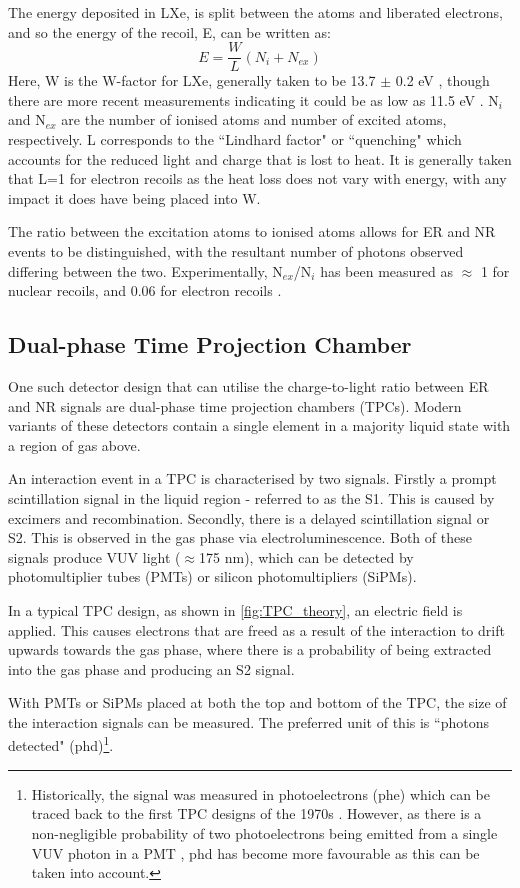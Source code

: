 \par
The energy deposited in LXe, is split between the atoms and liberated electrons, and so the energy of the recoil, E, can be written as:
\begin{equation}
    E = \frac{W}{L}(N_i + N_{ex})
\end{equation}
Here, W is the W-factor for LXe, generally taken to be 13.7 $\pm$ 0.2 eV \cite{light_and_charge_of_xenon_ref}, though there are more recent measurements indicating it could be as low as 11.5 eV \cite{electron_excitation_energy_of_xenon_ref}. 
N$_i$ and N$_{ex}$ are the number of ionised atoms and number of excited atoms, respectively.
L corresponds to the ``Lindhard factor" or ``quenching" which accounts for the reduced light and charge that is lost to heat.
It is generally taken that L=1 for electron recoils as the heat loss does not vary with energy, with any impact it does have being placed into W.
\par
The ratio between the excitation atoms to ionised atoms allows for ER and NR events to be distinguished, with the resultant number of photons observed differing between the two.
Experimentally, N$_{ex}$/N$_i$ has been measured as $\approx$ 1 for nuclear recoils, and 0.06 for electron recoils \cite{ionisation_to_excitation_ratio_xenon_ref}.

\subsection{Dual-phase Time Projection Chamber}
\par
One such detector design that can utilise the charge-to-light ratio between ER and NR signals are dual-phase time projection chambers (TPCs).
Modern variants of these detectors contain a single element in a majority liquid state with a region of gas above.
\par
An interaction event in a TPC is characterised by two signals.
Firstly a prompt scintillation signal in the liquid region - referred to as the S1.
This is caused by excimers and recombination.
Secondly, there is a delayed scintillation signal or S2.
This is observed in the gas phase via electroluminescence.
Both of these signals produce VUV light ($\approx$175 nm), which can be detected by photomultiplier tubes (PMTs) or silicon photomultipliers (SiPMs).
\par
In a typical TPC design, as shown in \autoref{fig:TPC_theory}, an electric field is applied.
This causes electrons that are freed as a result of the interaction to drift upwards towards the gas phase, where there is a probability of being extracted into the gas phase and producing an S2 signal.
\par
With PMTs or SiPMs placed at both the top and bottom of the TPC, the size of the interaction signals can be measured.
The preferred unit of this is ``photons detected" (phd)\footnote{Historically, the signal was measured in photoelectrons (phe) which can be traced back to the first TPC designs of the 1970s \cite{tpc_origins_ref}. However, as there is a non-negligible probability of two photoelectrons being emitted from a single VUV photon in a PMT \cite{pmts_in_xenon_ref}, phd has become more favourable as this can be taken into account.}.

